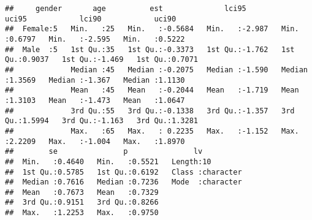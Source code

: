 \documentclass[
]{article}
\begin{document}
\begin{verbatim}
##     gender       age          est              lci95            uci95            lci90            uci90       
##  Female:5   Min.   :25   Min.   :-0.5684   Min.   :-2.987   Min.   :0.6797   Min.   :-2.595   Min.   :0.5222  
##  Male  :5   1st Qu.:35   1st Qu.:-0.3373   1st Qu.:-1.762   1st Qu.:0.9037   1st Qu.:-1.469   1st Qu.:0.7071  
##             Median :45   Median :-0.2075   Median :-1.590   Median :1.3569   Median :-1.367   Median :1.1130  
##             Mean   :45   Mean   :-0.2044   Mean   :-1.719   Mean   :1.3103   Mean   :-1.473   Mean   :1.0647  
##             3rd Qu.:55   3rd Qu.:-0.1338   3rd Qu.:-1.357   3rd Qu.:1.5994   3rd Qu.:-1.163   3rd Qu.:1.3281  
##             Max.   :65   Max.   : 0.2235   Max.   :-1.152   Max.   :2.2209   Max.   :-1.004   Max.   :1.8970  
##        se               p               lv           
##  Min.   :0.4640   Min.   :0.5521   Length:10         
##  1st Qu.:0.5785   1st Qu.:0.6192   Class :character  
##  Median :0.7616   Median :0.7236   Mode  :character  
##  Mean   :0.7673   Mean   :0.7329                     
##  3rd Qu.:0.9151   3rd Qu.:0.8266                     
##  Max.   :1.2253   Max.   :0.9750
\end{verbatim}
\end{document}
